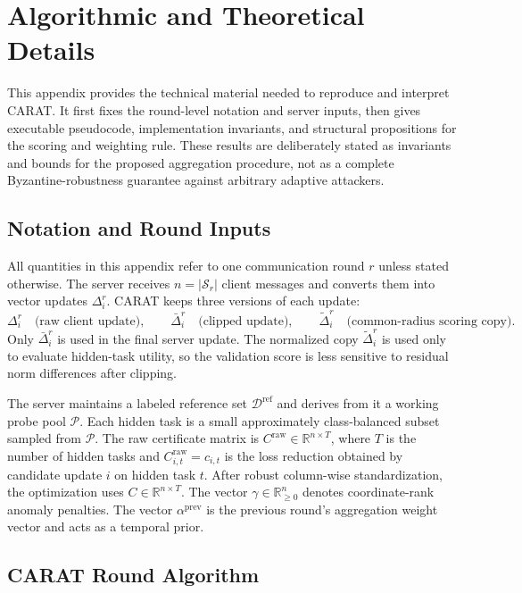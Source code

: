 \section{Algorithmic and Theoretical Details}
\label{sec:appendix-algorithm-theory}

This appendix provides the technical material needed to reproduce and interpret CARAT. It first fixes the round-level notation and server inputs, then gives executable pseudocode, implementation invariants, and structural propositions for the scoring and weighting rule. These results are deliberately stated as invariants and bounds for the proposed aggregation procedure, not as a complete Byzantine-robustness guarantee against arbitrary adaptive attackers.

\subsection{Notation and Round Inputs}
\label{sec:appendix-notation}

All quantities in this appendix refer to one communication round $r$ unless stated otherwise. The server receives $n=|\mathcal{S}_r|$ client messages and converts them into vector updates $\Delta_i^r$. CARAT keeps three versions of each update:
\[
\Delta_i^r
\quad\text{(raw client update)},\qquad
\bar{\Delta}_i^r
\quad\text{(clipped update)},\qquad
\tilde{\Delta}_i^r
\quad\text{(common-radius scoring copy)}.
\]
Only $\bar{\Delta}_i^r$ is used in the final server update. The normalized copy $\tilde{\Delta}_i^r$ is used only to evaluate hidden-task utility, so the validation score is less sensitive to residual norm differences after clipping.

The server maintains a labeled reference set $\mathcal{D}^{\mathrm{ref}}$ and derives from it a working probe pool $\mathcal{P}$. Each hidden task is a small approximately class-balanced subset sampled from $\mathcal{P}$. The raw certificate matrix is $C^{\mathrm{raw}}\in\mathbb{R}^{n\times T}$, where $T$ is the number of hidden tasks and $C^{\mathrm{raw}}_{i,t}=c_{i,t}$ is the loss reduction obtained by candidate update $i$ on hidden task $t$. After robust column-wise standardization, the optimization uses $C\in\mathbb{R}^{n\times T}$. The vector $\gamma\in\mathbb{R}^n_{\ge 0}$ denotes coordinate-rank anomaly penalties. The vector $\alpha^{\mathrm{prev}}$ is the previous round's aggregation weight vector and acts as a temporal prior.

\subsection{CARAT Round Algorithm}
\label{sec:appendix-algorithm}

